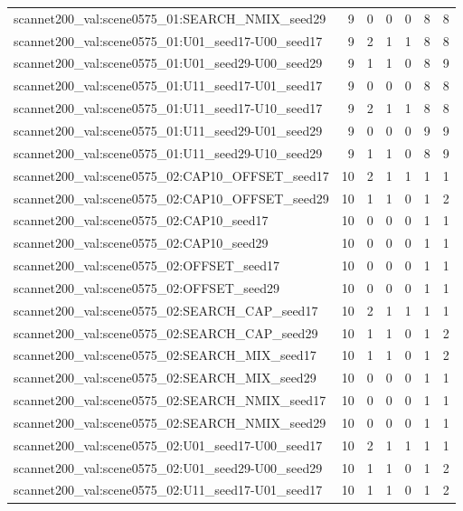 \begin{table}[t]
\begin{tabular}{lrrrrrr}
scannet200\_val:scene0575\_01:SEARCH\_NMIX\_seed29 & 9 & 0 & 0 & 0 & 8 & 8 \\
scannet200\_val:scene0575\_01:U01\_seed17-U00\_seed17 & 9 & 2 & 1 & 1 & 8 & 8 \\
scannet200\_val:scene0575\_01:U01\_seed29-U00\_seed29 & 9 & 1 & 1 & 0 & 8 & 9 \\
scannet200\_val:scene0575\_01:U11\_seed17-U01\_seed17 & 9 & 0 & 0 & 0 & 8 & 8 \\
scannet200\_val:scene0575\_01:U11\_seed17-U10\_seed17 & 9 & 2 & 1 & 1 & 8 & 8 \\
scannet200\_val:scene0575\_01:U11\_seed29-U01\_seed29 & 9 & 0 & 0 & 0 & 9 & 9 \\
scannet200\_val:scene0575\_01:U11\_seed29-U10\_seed29 & 9 & 1 & 1 & 0 & 8 & 9 \\
scannet200\_val:scene0575\_02:CAP10\_OFFSET\_seed17 & 10 & 2 & 1 & 1 & 1 & 1 \\
scannet200\_val:scene0575\_02:CAP10\_OFFSET\_seed29 & 10 & 1 & 1 & 0 & 1 & 2 \\
scannet200\_val:scene0575\_02:CAP10\_seed17 & 10 & 0 & 0 & 0 & 1 & 1 \\
scannet200\_val:scene0575\_02:CAP10\_seed29 & 10 & 0 & 0 & 0 & 1 & 1 \\
scannet200\_val:scene0575\_02:OFFSET\_seed17 & 10 & 0 & 0 & 0 & 1 & 1 \\
scannet200\_val:scene0575\_02:OFFSET\_seed29 & 10 & 0 & 0 & 0 & 1 & 1 \\
scannet200\_val:scene0575\_02:SEARCH\_CAP\_seed17 & 10 & 2 & 1 & 1 & 1 & 1 \\
scannet200\_val:scene0575\_02:SEARCH\_CAP\_seed29 & 10 & 1 & 1 & 0 & 1 & 2 \\
scannet200\_val:scene0575\_02:SEARCH\_MIX\_seed17 & 10 & 1 & 1 & 0 & 1 & 2 \\
scannet200\_val:scene0575\_02:SEARCH\_MIX\_seed29 & 10 & 0 & 0 & 0 & 1 & 1 \\
scannet200\_val:scene0575\_02:SEARCH\_NMIX\_seed17 & 10 & 0 & 0 & 0 & 1 & 1 \\
scannet200\_val:scene0575\_02:SEARCH\_NMIX\_seed29 & 10 & 0 & 0 & 0 & 1 & 1 \\
scannet200\_val:scene0575\_02:U01\_seed17-U00\_seed17 & 10 & 2 & 1 & 1 & 1 & 1 \\
scannet200\_val:scene0575\_02:U01\_seed29-U00\_seed29 & 10 & 1 & 1 & 0 & 1 & 2 \\
scannet200\_val:scene0575\_02:U11\_seed17-U01\_seed17 & 10 & 1 & 1 & 0 & 1 & 2 \\

\end{tabular}
\end{table}
